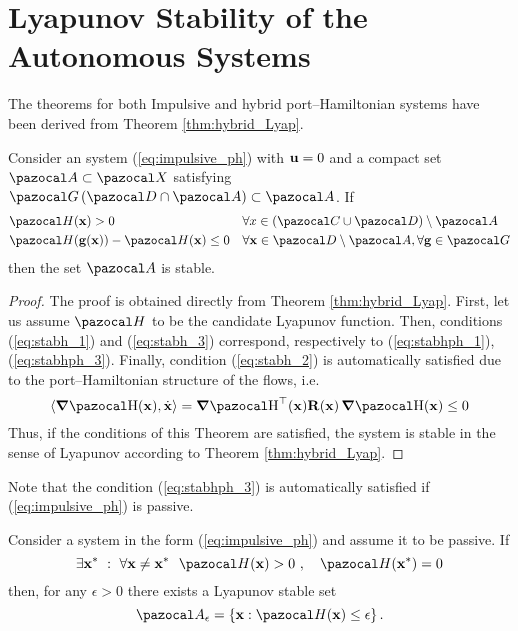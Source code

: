 \section{Lyapunov Stability of the Autonomous Systems}
%
The theorems for both Impulsive and hybrid port--Hamiltonian systems have been derived from Theorem \ref{thm:hybrid_Lyap}.
%
\begin{thm}\label{thm:impulsive_lyap}
    Consider an system (\ref{eq:impulsive_ph}) with $\mathbf{u} = 0$	and a compact set $\A\subset\X$ satisfying $\G\left(\D\cap\A\right)\subset\A$. If
	\begin{subequations}
		\begin{align}
		&\Ha(\xb)>0&&\forall x\in \left(\C\cup\D\right)\setminus\A\label{eq:stabhph_1}\\
		&\Ha(\gb(\xb)) - \Ha(\xb)\leq 0 &&\forall \xb\in\D\setminus\A,\forall \gb\in\G\label{eq:stabhph_3}
		\end{align}
	\end{subequations}
	then the set $\A$ is stable.
\end{thm}
%
\begin{proof}
    The proof is obtained directly from Theorem \ref{thm:hybrid_Lyap}. First, let us assume $\Ha$ to be the candidate Lyapunov function. Then, conditions (\ref{eq:stabh_1}) and (\ref{eq:stabh_3}) correspond, respectively to (\ref{eq:stabhph_1}), (\ref{eq:stabhph_3}). Finally, condition (\ref{eq:stabh_2}) is automatically satisfied due to the port--Hamiltonian structure of the flows, i.e.
    \begin{equation}
        \langle\dH(\xb),\dot{\xb}\rangle = \dH^\top(\xb)\Rb(\xb)\dH(\xb)\leq 0
    \end{equation}
    Thus, if the conditions of this Theorem are satisfied, the system is stable in the sense of Lyapunov according to Theorem \ref{thm:hybrid_Lyap}. 
\end{proof}
%
Note that the condition (\ref{eq:stabhph_3}) is automatically satisfied if (\ref{eq:impulsive_ph}) is passive.
%
\begin{cor}\label{cor:impulsive_lyap}
	Consider a system in the form (\ref{eq:impulsive_ph}) and assume it to be passive. If
	\begin{equation*}
	\exists \xb^*~:~\forall \xb\neq \xb^*~~\Ha(\xb)>0\text{ },\quad\Ha(\xb^*) = 0
	\end{equation*}
	then, for any $\epsilon>0$ there exists a Lyapunov stable set
	\[\A_\epsilon = \left\{\xb:\Ha(\xb)\leq\epsilon\right\}.\]
\end{cor}
